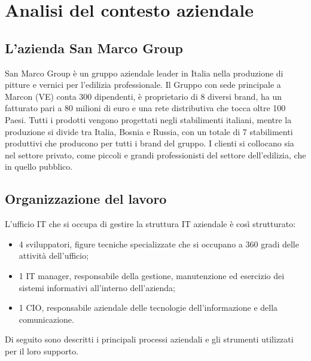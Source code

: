 
\chapter{Analisi del contesto aziendale}
\label{cap:analisi-del-contesto-aziendale}





\section{L'azienda San Marco Group}

San Marco Group è un gruppo aziendale leader in Italia nella produzione di pitture e vernici per l'edilizia professionale. Il Gruppo con sede principale a Marcon (VE) conta 300 dipendenti, è proprietario di 8 diversi brand, ha un fatturato pari a 80 milioni di euro e una rete distributiva che tocca oltre 100 Paesi. Tutti i prodotti vengono progettati negli stabilimenti italiani, mentre la produzione si divide tra Italia, Bosnia e Russia, con un totale di 7 stabilimenti produttivi che producono per tutti i brand del gruppo.
I clienti si collocano sia nel settore privato, come piccoli e grandi professionisti del settore dell'edilizia, che in quello pubblico.
\section{Organizzazione del lavoro}

L'ufficio IT che si occupa di gestire la struttura IT aziendale è così strutturato:
\begin{itemize}
	\item 4 sviluppatori, figure tecniche specializzate che si occupano a 360 gradi delle attività dell'ufficio; 
	\item 1 IT manager, responsabile della gestione, manutenzione ed esercizio dei sistemi informativi all'interno dell'azienda; 
	\item 1 CIO, responsabile aziendale delle tecnologie dell'informazione e della comunicazione.
\end{itemize}
Di seguito sono descritti i principali processi aziendali e gli strumenti utilizzati per il loro supporto.


